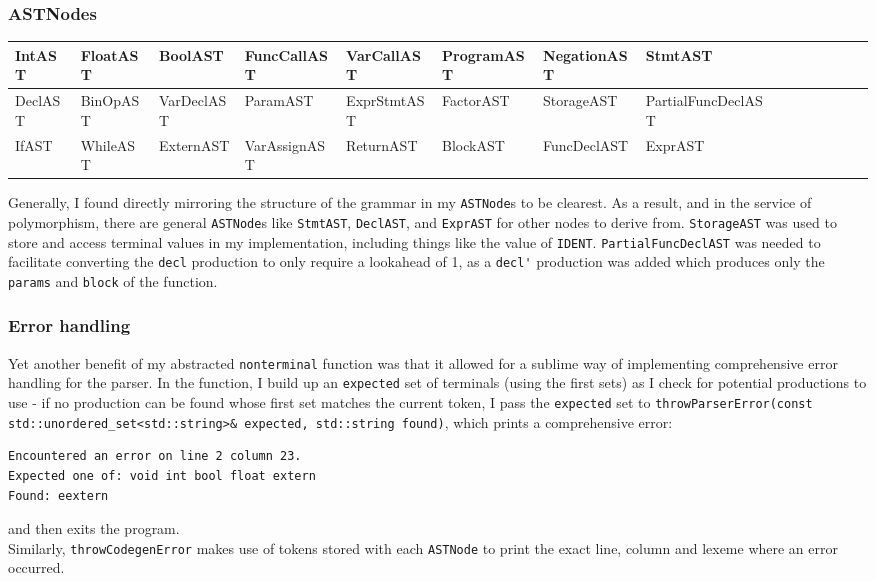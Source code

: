 \documentclass[10pt,a4paper]{article}
\newcommand{\code}[1]{\lstinline!#1!}
\begin{document}
\subsubsection*{ASTNodes}
\begin{table}[htbp]
    \centering
    \begin{adjustbox}{center}
    \begin{tabular}{|l|l|l|l|l|l|l|l|l|l|l|l|l|l|l|}
    \hline
    IntAST & FloatAST & BoolAST & FuncCallAST & VarCallAST & ProgramAST & NegationAST & StmtAST\\
    \hline
    DeclAST & BinOpAST & VarDeclAST & ParamAST & ExprStmtAST&FactorAST & StorageAST & PartialFuncDeclAST\\
    \hline
    IfAST & WhileAST & ExternAST & VarAssignAST & ReturnAST & BlockAST & FuncDeclAST & ExprAST\\
    \hline
    \end{tabular}
\end{adjustbox}
\end{table}
\noindent Generally, I found directly mirroring the structure of the grammar in my \code{ASTNode}s to be clearest. As a result, and in the service of polymorphism, there are general \code{ASTNode}s like \code{StmtAST}, \code{DeclAST}, and \code{ExprAST} for other nodes to derive from.
\code{StorageAST} was used to store and access terminal values in my implementation, including things like the value of \code{IDENT}. \code{PartialFuncDeclAST} was needed to facilitate converting the \code{decl} production to only require a lookahead of 1, as a \code{decl'} production was added which produces only the \code{params} and \code{block} of the function.
\subsubsection*{Error handling}
Yet another benefit of my abstracted \code{nonterminal} function was that it allowed for a sublime way of implementing comprehensive error handling for the parser. In the function, I build up an \code{expected} set of terminals (using the first sets) as I check for potential productions to use - if no production can be found whose first set matches the current token, I pass the \code{expected} set to \code{throwParserError(const std::unordered_set<std::string>& expected, std::string found)}, which prints a comprehensive error:
\begin{lstlisting}[]
Encountered an error on line 2 column 23.
Expected one of: void int bool float extern 
Found: eextern
\end{lstlisting}
and then exits the program.\\
Similarly,
\code{throwCodegenError} makes use of tokens stored with each \code{ASTNode} to print the exact line, column and lexeme where an error occurred.
\end{document}
